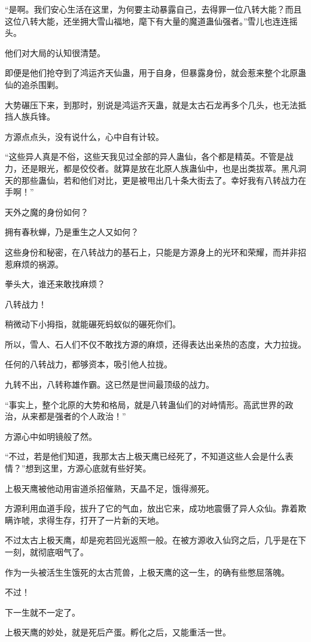 \begin{this_body}
“是啊。我们安心生活在这里，为何要主动暴露自己，去得罪一位八转大能？而且这位八转大能，还坐拥大雪山福地，麾下有大量的魔道蛊仙强者。”雪儿也连连摇头。

他们对大局的认知很清楚。

即便是他们抢夺到了鸿运齐天仙蛊，用于自身，但暴露身份，就会惹来整个北原蛊仙的追杀围剿。

大势碾压下来，到那时，别说是鸿运齐天蛊，就是太古石龙再多个几头，也无法抵挡人族兵锋。

方源点点头，没有说什么，心中自有计较。

“这些异人真是不俗，这些天我见过全部的异人蛊仙，各个都是精英。不管是战力，还是眼光，都是佼佼者。就算是放在北原人族蛊仙中，也是出类拔萃。黑凡洞天的那些蛊仙，若和他们对比，更是被甩出几十条大街去了。幸好我有八转战力在手啊！”

天外之魔的身份如何？

拥有春秋蝉，乃是重生之人又如何？

这些身份和秘密，在八转战力的基石上，只能是方源身上的光环和荣耀，而并非招惹麻烦的祸源。

拳头大，谁还来敢找麻烦？

八转战力！

稍微动下小拇指，就能碾死蚂蚁似的碾死你们。

所以，雪人、石人们不仅不敢找方源的麻烦，还得表达出亲热的态度，大力拉拢。

任何的八转战力，都够资本，吸引他人拉拢。

九转不出，八转称雄作霸。这已然是世间最顶级的战力。

“事实上，整个北原的大势和格局，就是八转蛊仙们的对峙情形。高武世界的政治，从来都是强者的个人政治！”

方源心中如明镜般了然。

“不过，若是他们知道，我那太古上极天鹰已经死了，不知道这些人会是什么表情？”想到这里，方源心底就有些好笑。

上极天鹰被他动用宙道杀招催熟，天晶不足，饿得濒死。

方源利用血道手段，拔升了它的气血，放出它来，成功地震慑了异人众仙。靠着欺瞒诈唬，求得生存，打开了一片新的天地。

不过太古上极天鹰，却是宛若回光返照一般。在被方源收入仙窍之后，几乎是在下一刻，就彻底咽气了。

作为一头被活生生饿死的太古荒兽，上极天鹰的这一生，的确有些憋屈落魄。

不过！

下一生就不一定了。

上极天鹰的妙处，就是死后产蛋。孵化之后，又能重活一世。


\end{this_body}
